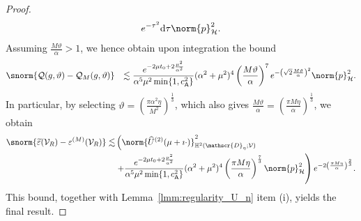 \begin{proof}
\begin{equation}
\begin{aligned}
	e^{-\tau^2}
	\text{d} \tau
    \norm{p}^2_\mathcal{H}.
\end{aligned}
\end{equation}
Assuming $\frac{M\vartheta}{\alpha}>1$, we hence obtain upon integration the bound
\begin{equation}
\begin{aligned}
	\snorm{
	       \mathcal{Q}(g,\vartheta)
     	-
        \mathcal{Q}_M(g,\vartheta)
	}
	&
	&
	\lesssim
	\frac{e^{-2\mu t_0+2\frac{\mu^2}{\alpha^2}}}{\alpha^5 \mu^2 \min\{1, c^2_{\mathsf{A}}\}}
    (\alpha^2+\mu^2)^4
    \left(\frac{M\vartheta}{\alpha}\right)^7
    e^{
    -\left(\sqrt{2}\frac{M\vartheta}{\alpha}\right)^2}
    \norm{p}^2_{\mathcal{H}}.
\end{aligned}
\end{equation}
In particular, by selecting $\vartheta = \left( \frac{ \pi \alpha^2 \eta}{M^2} \right)^{\frac{1}{3}}$,
which also gives $\frac{M\vartheta}{\alpha} = \left(\frac{\pi M \eta}{\alpha} \right)^{\frac{1}{3}}$, we obtain
\begin{equation}
\begin{aligned}
	\snorm{
		\widetilde{\varepsilon}(\mathcal{V}_R)
		-
		{\varepsilon}^{(M)}(\mathcal{V}_R)
	}
	\lesssim
	&
	\left(
       	\norm{
    			\widehat{U}^{(2)}(\mu+\imath \cdot) 
    		}^2_{\mathbb{H}^2(\mathscr{D}_\eta;\mathcal{V})}
	\right.
	\\
	&
	\left.
        +
		\frac{e^{-2\mu t_0+2\frac{\mu^2}{\alpha^2}}}{\alpha^5 \mu^2 \min\{1, c^2_{\mathsf{A}}\}}
    		(\alpha^2+\mu^2)^4
    		\left(\frac{\pi M \eta}{\alpha} \right)^\frac{7}{3}
	            \norm{p}^2_{\mathcal{H}}\right)
	e^{-2\left(\frac{\pi M \eta}{\alpha} \right)^{\frac{2}{3}}}.
\end{aligned}
\end{equation}
This bound, together with Lemma~\ref{lmm:regularity_U_n} item (i), yields the final result. 
\end{proof}

